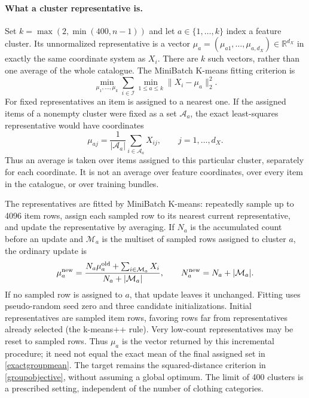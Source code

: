 \documentclass[11pt,a4paper]{article}
\newcommand{\I}{\mathcal I}\newcommand{\pos}[1]{\left[#1\right]_+}
\numberwithin{equation}{section}
\begin{document}
\paragraph{What a cluster representative is.}
Set $k=\max(2,\min(400,n-1))$ and let $a\in\{1,\ldots,k\}$ index a feature
cluster. Its unnormalized representative is a vector
$\mu_a=(\mu_{a1},\ldots,\mu_{a,d_X})\in\mathbb R^{d_X}$ in exactly the same
coordinate system as $X_i$. There are $k$ such vectors, rather than one average
of the whole catalogue. The MiniBatch K-means fitting criterion is
\begin{equation}\label{groupobjective}
 \min_{\mu_1,\ldots,\mu_k}\sum_{i\in\I}
       \min_{1\le a\le k}\lVert X_i-\mu_a\rVert_2^2.
\end{equation}
For fixed representatives an item is assigned to a nearest one. If the assigned
items of a nonempty cluster were fixed as a set $\mathcal A_a$, the exact
least-squares representative would have coordinates
\begin{equation}\label{exactgroupmean}
 \mu_{aj}=\frac1{|\mathcal A_a|}\sum_{i\in\mathcal A_a}X_{ij},
 \qquad j=1,\ldots,d_X.
\end{equation}
Thus an average is taken over items assigned to this particular cluster,
separately for each coordinate. It is not an average over feature coordinates,
over every item in the catalogue, or over training bundles.

The representatives are fitted by MiniBatch K-means: repeatedly sample up to
4096 item rows, assign each sampled row to its nearest current representative,
and update the representative by averaging. If $N_a$ is the accumulated count
before an update and $\mathcal M_a$ is the multiset of sampled rows assigned to
cluster $a$, the ordinary update is
\begin{equation}\label{batchgroupmean}
 \mu_a^{\rm new}=
 \frac{N_a\mu_a^{\rm old}+\sum_{i\in\mathcal M_a}X_i}
      {N_a+|\mathcal M_a|},\qquad
 N_a^{\rm new}=N_a+|\mathcal M_a|.
\end{equation}
If no sampled row is assigned to $a$, that update leaves it unchanged. Fitting
uses pseudo-random seed zero and three candidate initializations. Initial
representatives are sampled item rows, favoring rows far from representatives
already selected (the k-means++ rule). Very low-count representatives may be
reset to sampled rows. Thus $\mu_a$ is the vector returned by this incremental
procedure; it need not equal the exact mean of the final assigned set in
\eqref{exactgroupmean}. The target remains the squared-distance criterion in
\eqref{groupobjective}, without assuming a global optimum. The limit of 400
clusters is a prescribed setting, independent of the number of clothing categories.
\end{document}
